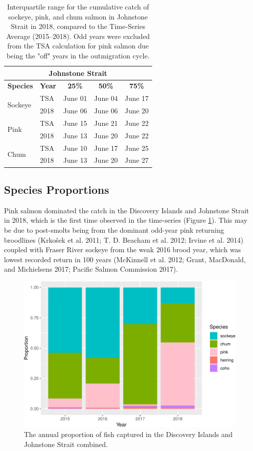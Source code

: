 \documentclass[fleqn,10pt]{wlpeerj} %
\begin{document}
\begin{table}[ht]
\centering
\begin{tabular}{l|l||c|c|c}
\multicolumn{5}{c}{\textbf{Johnstone Strait}} \\
\hline
\textbf{Species} & \textbf{Year} & \textbf{25\%} & \textbf{50\%} & \textbf{75\%} \\
\hline
\multirow{2}{*}{Sockeye} & TSA & June 01 & June 04 & June 17 \\
& 2018 & June 06 & June 06 & June 20 \\
\hline
\multirow{2}{*}{Pink} & TSA & June 15 & June 21 & June 22 \\
& 2018 & June 13 & June 20 & June 22 \\
\hline
\multirow{2}{*}{Chum} & TSA & June 10 & June 17 & June 25 \\
& 2018 & June 13 & June 20 & June 27 \\
\end{tabular}
\caption{\label{tab:mt_js}Interquartile range for the cumulative catch of sockeye, pink, and chum salmon in Johnstone Strait in 2018, compared to the Time-Series Average (2015--2018). Odd years were excluded from the TSA calculation for pink salmon due being the "off" years in the outmigration cycle.}
\end{table}

\subsection*{Species Proportions}\label{species-proportions}

Pink salmon dominated the catch in the Discovery Islands and Johnstone
Strait in 2018, which is the first time observed in the time-series
(Figure \ref{fig:prop}). This may be due to post-smolts being from the
dominant odd-year pink returning broodlines (Krkošek et al. 2011; T. D.
Beacham et al. 2012; Irvine et al. 2014) coupled with Fraser River
sockeye from the weak 2016 brood year, which was lowest recorded return
in 100 years (McKinnell et al. 2012; Grant, MacDonald, and Michielsens
2017; Pacific Salmon Commission 2017).

\begin{figure}
\includegraphics[width=0.8\linewidth]{peer_j_migration_dynamics_files/figure-latex/prop-1} \caption{The annual proportion of fish captured in the Discovery Islands and Johnstone Strait combined.}\label{fig:prop}
\end{figure}
\end{document}
